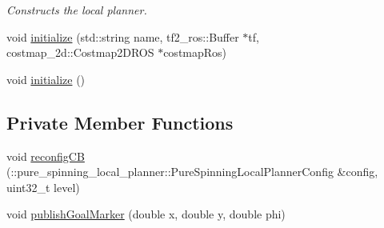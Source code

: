 \begin{DoxyCompactItemize}
\begin{DoxyCompactList}\small\item\em Constructs the local planner. \end{DoxyCompactList}\item 
void \hyperlink{classcl__move__base__z_1_1pure__spinning__local__planner_1_1PureSpinningLocalPlanner_ab28ef2ff04e7ec2b74068ea0fe3351d6}{initialize} (std\+::string name, tf2\+\_\+ros\+::\+Buffer $\ast$tf, costmap\+\_\+2d\+::\+Costmap2\+D\+R\+OS $\ast$costmap\+Ros)
\item 
void \hyperlink{classcl__move__base__z_1_1pure__spinning__local__planner_1_1PureSpinningLocalPlanner_a12fc5253f53f66e3e9735a72ebc9343f}{initialize} ()
\end{DoxyCompactItemize}
\subsection*{Private Member Functions}
\begin{DoxyCompactItemize}
\item 
void \hyperlink{classcl__move__base__z_1_1pure__spinning__local__planner_1_1PureSpinningLocalPlanner_a0caa25064ba8af05092feaad53e602b9}{reconfig\+CB} (\+::pure\+\_\+spinning\+\_\+local\+\_\+planner\+::\+Pure\+Spinning\+Local\+Planner\+Config \&config, uint32\+\_\+t level)
\item 
void \hyperlink{classcl__move__base__z_1_1pure__spinning__local__planner_1_1PureSpinningLocalPlanner_acbabe6590b2d5fc90275180ac09db43e}{publish\+Goal\+Marker} (double x, double y, double phi)
\end{DoxyCompactItemize}
